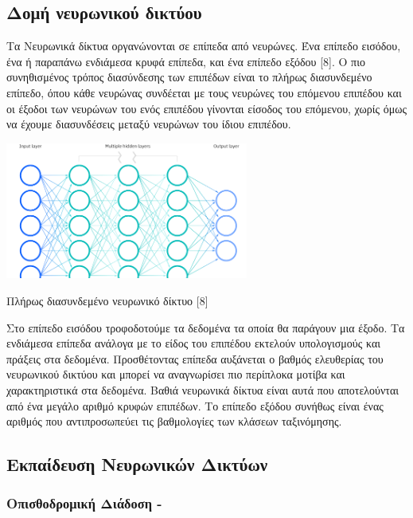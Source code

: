 \subsection{Δομή νευρωνικού δικτύου}
Τα Νευρωνικά δίκτυα οργανώνονται σε επίπεδα από νευρώνες. Ένα επίπεδο εισόδου, ένα ή παραπάνω ενδιάμεσα κρυφά επίπεδα, και ένα επίπεδο εξόδου [8]. Ο πιο συνηθισμένος τρόπος διασύνδεσης των επιπέδων είναι το πλήρως διασυνδεμένο επίπεδο, όπου κάθε νευρώνας συνδέεται με τους νευρώνες του επόμενου επιπέδου και οι έξοδοι των νευρώνων του ενός επιπέδου γίνονται είσοδος του επόμενου, χωρίς όμως να έχουμε διασυνδέσεις μεταξύ νευρώνων του ίδιου επιπέδου.  

\begin{Illustration}[!h] 
	\centering
	\includegraphics[width=0.6\textwidth]{images/image012.png} \caption{Πλήρως διασυνδεμένο νευρωνικό δίκτυο [8]} 
	\label{fc-network}
\end{Illustration}


Στο επίπεδο εισόδου τροφοδοτούμε τα δεδομένα τα οποία θα παράγουν μια έξοδο. Τα ενδιάμεσα επίπεδα ανάλογα με το είδος του επιπέδου εκτελούν υπολογισμούς και πράξεις στα δεδομένα. Προσθέτοντας επίπεδα αυξάνεται ο βαθμός ελευθερίας του νευρωνικού δικτύου και μπορεί να αναγνωρίσει πιο περίπλοκα μοτίβα και χαρακτηριστικά στα δεδομένα. Βαθιά νευρωνικά δίκτυα είναι αυτά που αποτελούνται από ένα μεγάλο αριθμό κρυφών επιπέδων. Το επίπεδο εξόδου συνήθως είναι ένας αριθμός που αντιπροσωπεύει τις βαθμολογίες των κλάσεων ταξινόμησης.

\subsection{Εκπαίδευση Νευρωνικών Δικτύων}

\subsubsection{Οπισθοδρομική Διάδοση - }

